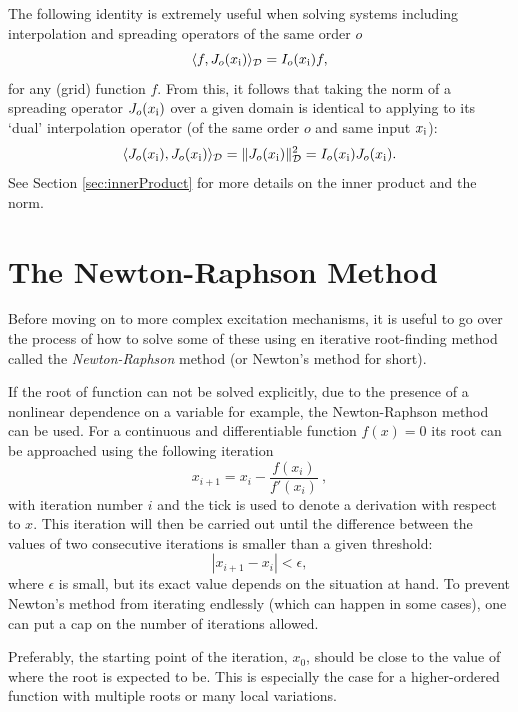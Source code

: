 The following identity is extremely useful when solving systems including interpolation and spreading operators of the same order $o$
\begin{equation}\label{eq:identityIJ}
    \langle f, J_o(x_{\text{i}}) \rangle_{\mathcal{D}} = I_o(x_{\text{i}}) f,
\end{equation}
for any (grid) function $f$. From this, it follows that taking the norm of a spreading operator $J_o(x_{\text{i}})$ over a given domain is identical to applying to its `dual' interpolation operator (of the same order $o$ and same input $x_{\text{i}}$):
\begin{equation}
    \langle  J_o(x_{\text{i}}), J_o(x_{\text{i}})\rangle_{\mathcal{D}} = \lVert J_o(x_{\text{i}})\rVert^2_{\mathcal{D}} = I_o(x_{\text{i}})J_o(x_{\text{i}}).
\end{equation}
See Section \eqref{sec:innerProduct} for more details on the inner product and the norm.


\section{The Newton-Raphson Method}\label{sec:newtonRaphson}
Before moving on to more complex excitation mechanisms, it is useful to go over the process of how to solve some of these using en iterative root-finding method called the \textit{Newton-Raphson} method (or Newton's method for short). 

If the root of function can not be solved explicitly, due to the presence of a nonlinear dependence on a variable  for example, the Newton-Raphson method can be used. For a continuous and differentiable function $f(x) = 0$ its root can be approached using the following iteration
\begin{equation}\label{eq:newtonRaphson}
    x_{i+1} = x_i - \frac{f(x_i)}{f'(x_i)}\ ,
\end{equation}
with iteration number $i$ and the tick is used to denote a derivation with respect to $x$.
This iteration will then be carried out until the difference between the values of two consecutive iterations is smaller than a given threshold:
\begin{equation}\label{eq:NRthreshold}
    |x_{i+1} - x_i| < \epsilon,
\end{equation} 
where $\epsilon$ is small, but its exact value depends on the situation at hand. To prevent Newton's method from iterating endlessly (which can happen in some cases), one can put a cap on the number of iterations allowed. 

Preferably, the starting point of the iteration, $x_0$, should be close to the value of where the root is expected to be. This is especially the case for a higher-ordered function with multiple roots or many local variations. 

